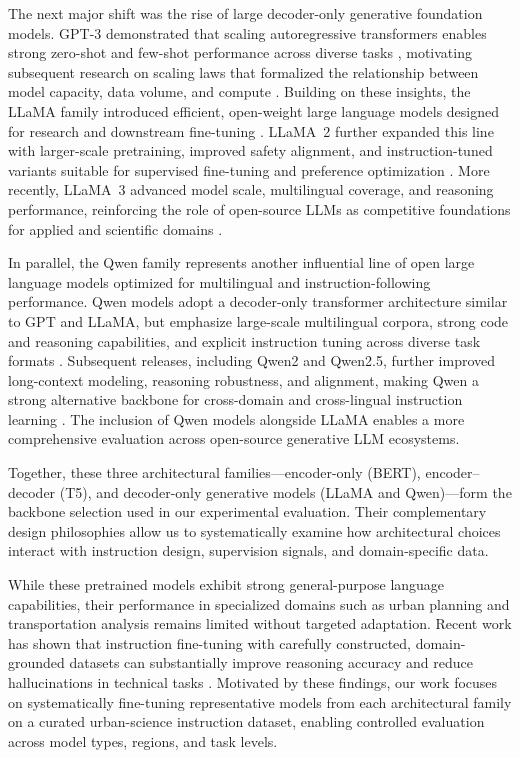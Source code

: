 \documentclass[a4paper,fleqn]{cas-sc}
\begin{document}
The next major shift was the rise of large decoder-only generative foundation models. GPT-3 demonstrated that scaling autoregressive transformers enables strong zero-shot and few-shot performance across diverse tasks \cite{brown2020gpt3}, motivating subsequent research on scaling laws that formalized the relationship between model capacity, data volume, and compute \cite{kaplan2020scaling}. Building on these insights, the LLaMA family introduced efficient, open-weight large language models designed for research and downstream fine-tuning \cite{touvron2023llama2}. LLaMA~2 further expanded this line with larger-scale pretraining, improved safety alignment, and instruction-tuned variants suitable for supervised fine-tuning and preference optimization \cite{touvron2023llama2}. More recently, LLaMA~3 advanced model scale, multilingual coverage, and reasoning performance, reinforcing the role of open-source LLMs as competitive foundations for applied and scientific domains \cite{meta2024llama3}.

In parallel, the Qwen family represents another influential line of open large language models optimized for multilingual and instruction-following performance. Qwen models adopt a decoder-only transformer architecture similar to GPT and LLaMA, but emphasize large-scale multilingual corpora, strong code and reasoning capabilities, and explicit instruction tuning across diverse task formats \cite{bai2023qwen}. Subsequent releases, including Qwen2 and Qwen2.5, further improved long-context modeling, reasoning robustness, and alignment, making Qwen a strong alternative backbone for cross-domain and cross-lingual instruction learning \cite{qwen2024technical}. The inclusion of Qwen models alongside LLaMA enables a more comprehensive evaluation across open-source generative LLM ecosystems.

Together, these three architectural families---encoder-only (BERT), encoder--decoder (T5), and decoder-only generative models (LLaMA and Qwen)---form the backbone selection used in our experimental evaluation. Their complementary design philosophies allow us to systematically examine how architectural choices interact with instruction design, supervision signals, and domain-specific data.

While these pretrained models exhibit strong general-purpose language capabilities, their performance in specialized domains such as urban planning and transportation analysis remains limited without targeted adaptation. Recent work has shown that instruction fine-tuning with carefully constructed, domain-grounded datasets can substantially improve reasoning accuracy and reduce hallucinations in technical tasks \cite{wei2022finetuned,chung2022scaling}. Motivated by these findings, our work focuses on systematically fine-tuning representative models from each architectural family on a curated urban-science instruction dataset, enabling controlled evaluation across model types, regions, and task levels.
\end{document}
